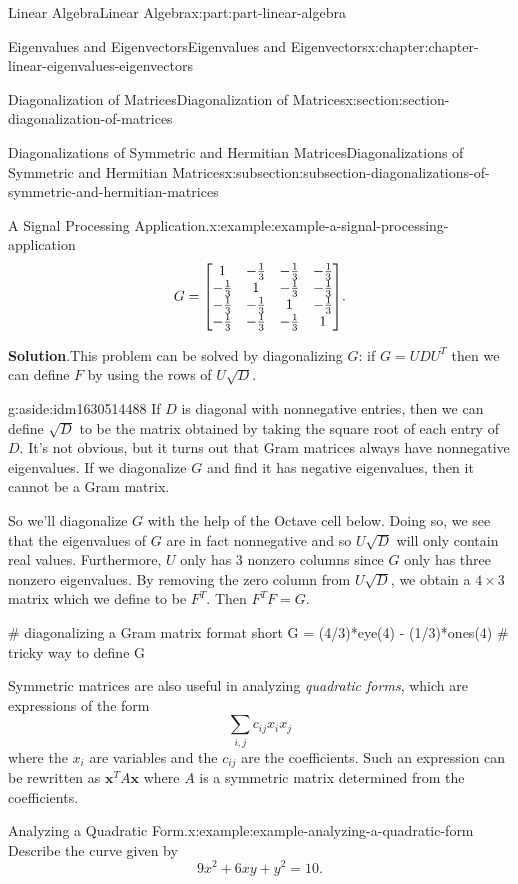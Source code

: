 \documentclass[twoside,10pt,]{book}
\newcommand{\blocktitlefont}{\relax}
\numberwithin{equation}{part}
\newcommand{\xx}{\mathbf{x}}
\begin{document}
\begin{partptx}{Linear Algebra}{}{Linear Algebra}{}{}{x:part:part-linear-algebra}
\begin{chapterptx}{Eigenvalues and Eigenvectors}{}{Eigenvalues and Eigenvectors}{}{}{x:chapter:chapter-linear-eigenvalues-eigenvectors}
\begin{sectionptx}{Diagonalization of Matrices}{}{Diagonalization of Matrices}{}{}{x:section:section-diagonalization-of-matrices}
\begin{subsectionptx}{Diagonalizations of Symmetric and Hermitian Matrices}{}{Diagonalizations of Symmetric and Hermitian Matrices}{}{}{x:subsection:subsection-diagonalizations-of-symmetric-and-hermitian-matrices}
\begin{example}{A Signal Processing Application.}{x:example:example-a-signal-processing-application}
\begin{equation*}
G = \mqty[1 & -\frac{1}{3} & -\frac{1}{3} & -\frac{1}{3} \\ -\frac{1}{3} & 1 & -\frac{1}{3} & -\frac{1}{3} \\ -\frac{1}{3} & -\frac{1}{3} & 1 & -\frac{1}{3} \\ -\frac{1}{3} & -\frac{1}{3} & -\frac{1}{3} & 1]\text{.}
\end{equation*}
%
\par\smallskip%
\noindent\textbf{\blocktitlefont Solution}.\hypertarget{g:solution:idm1630509752}{}\quad{}This problem can be solved by diagonalizing \(G\): if \(G = UDU^T\) then we can define \(F\) by using the rows of \(U\sqrt{D}\). \begin{aside}{}{g:aside:idm1630514488}%
If \(D\) is diagonal with nonnegative entries, then we can define \(\sqrt{D}\) to be the matrix obtained by taking the square root of each entry of \(D\). It's not obvious, but it turns out that Gram matrices always have nonnegative eigenvalues. If we diagonalize \(G\) and find it has negative eigenvalues, then it cannot be a Gram matrix.%
\end{aside}
 So we'll diagonalize \(G\) with the help of the Octave cell below. Doing so, we see that the eigenvalues of \(G\) are in fact nonnegative and so \(U\sqrt{D}\) will only contain real values. Furthermore, \(U\) only has \(3\) nonzero columns since \(G\) only has three nonzero eigenvalues. By removing the zero column from \(U\sqrt{D}\), we obtain a \(4\times3\) matrix which we define to be \(F^T\). Then \(F^TF = G\).%
\end{example}
\begin{sageinput}
# diagonalizing a Gram matrix
format short
G = (4/3)*eye(4) - (1/3)*ones(4) # tricky way to define G
\end{sageinput}
Symmetric matrices are also useful in analyzing \emph{quadratic forms}, which are expressions of the form%
\begin{equation*}
\sum_{i,j}c_{ij} x_ix_j
\end{equation*}
where the \(x_i\) are variables and the \(c_{ij}\) are the coefficients. Such an expression can be rewritten as \(\xx^T A\xx\) where \(A\) is a symmetric matrix determined from the coefficients.%
\begin{example}{Analyzing a Quadratic Form.}{x:example:example-analyzing-a-quadratic-form}%
Describe the curve given by%
\begin{equation*}
9x^2 + 6xy + y^2 = 10\text{.}
\end{equation*}
%
\par\smallskip%

\end{example}
\end{subsectionptx}
\end{sectionptx}
\end{chapterptx}
\end{partptx}
\end{document}
